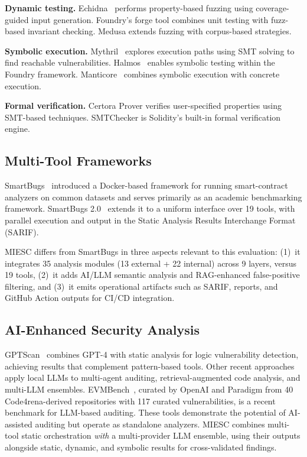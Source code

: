 \documentclass[conference]{IEEEtran}
\begin{document}
\textbf{Dynamic testing.} Echidna~\cite{grieco2020echidna} performs property-based fuzzing using coverage-guided input generation. Foundry's forge tool combines unit testing with fuzz-based invariant checking. Medusa extends fuzzing with corpus-based strategies.

\textbf{Symbolic execution.} Mythril~\cite{mueller2018smashing} explores execution paths using SMT solving to find reachable vulnerabilities. Halmos~\cite{halmos2023} enables symbolic testing within the Foundry framework. Manticore~\cite{mossberg2019manticore} combines symbolic execution with concrete execution.

\textbf{Formal verification.} Certora Prover verifies user-specified properties using SMT-based techniques. SMTChecker is Solidity's built-in formal verification engine.

\subsection{Multi-Tool Frameworks}

SmartBugs~\cite{ferreira2020smartbugs} introduced a Docker-based framework for running smart-contract analyzers on common datasets and serves primarily as an academic benchmarking framework. SmartBugs 2.0~\cite{smartbugs2023} extends it to a uniform interface over 19 tools, with parallel execution and output in the Static Analysis Results Interchange Format (SARIF).

MIESC differs from SmartBugs in three aspects relevant to this evaluation: (1)~it integrates 35 analysis modules (13 external + 22 internal) across 9 layers, versus 19 tools, (2)~it adds AI/LLM semantic analysis and RAG-enhanced false-positive filtering, and (3)~it emits operational artifacts such as SARIF, reports, and GitHub Action outputs for CI/CD integration.

\subsection{AI-Enhanced Security Analysis}

GPTScan~\cite{sun2024gptscan} combines GPT-4 with static analysis for logic vulnerability detection, achieving results that complement pattern-based tools. Other recent approaches apply local LLMs to multi-agent auditing, retrieval-augmented code analysis, and multi-LLM ensembles. EVMBench~\cite{evmbench2026}, curated by OpenAI and Paradigm from 40 Code4rena-derived repositories with 117 curated vulnerabilities, is a recent benchmark for LLM-based auditing. These tools demonstrate the potential of AI-assisted auditing but operate as standalone analyzers. MIESC combines multi-tool static orchestration \emph{with} a multi-provider LLM ensemble, using their outputs alongside static, dynamic, and symbolic results for cross-validated findings.
\end{document}
